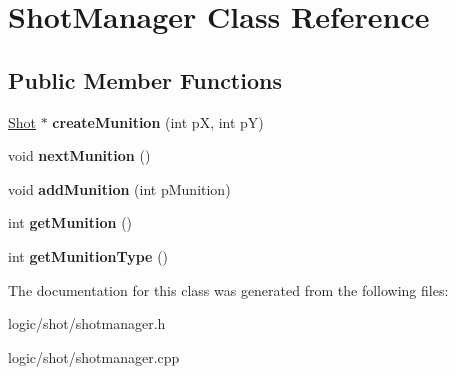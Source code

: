 \hypertarget{class_shot_manager}{\section{Shot\-Manager Class Reference}
\label{class_shot_manager}
}
\subsection*{Public Member Functions}
\begin{DoxyCompactItemize}
\item 
\hypertarget{class_shot_manager_a9ffcd5b29ccba8b53308c5442c3cb13a}{\hyperlink{class_shot}{Shot} $\ast$ {\bfseries create\-Munition} (int p\-X, int p\-Y)}\label{class_shot_manager_a9ffcd5b29ccba8b53308c5442c3cb13a}

\item 
\hypertarget{class_shot_manager_aebd2c9ed59082d4382d367abd7b39dd5}{void {\bfseries next\-Munition} ()}\label{class_shot_manager_aebd2c9ed59082d4382d367abd7b39dd5}

\item 
\hypertarget{class_shot_manager_af5fe9ec898ebccb644e4fdaa679bb255}{void {\bfseries add\-Munition} (int p\-Munition)}\label{class_shot_manager_af5fe9ec898ebccb644e4fdaa679bb255}

\item 
\hypertarget{class_shot_manager_a90c9df4f00b6670ec3247f910f392d83}{int {\bfseries get\-Munition} ()}\label{class_shot_manager_a90c9df4f00b6670ec3247f910f392d83}

\item 
\hypertarget{class_shot_manager_a1dd2f63018916237eea902a21cb1b7a7}{int {\bfseries get\-Munition\-Type} ()}\label{class_shot_manager_a1dd2f63018916237eea902a21cb1b7a7}

\end{DoxyCompactItemize}


The documentation for this class was generated from the following files\-:\begin{DoxyCompactItemize}
\item 
logic/shot/shotmanager.\-h\item 
logic/shot/shotmanager.\-cpp\end{DoxyCompactItemize}
